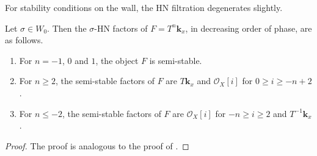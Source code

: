 \documentclass{amsart}
\begin{document}
For stability conditions on the wall, the HN filtration degenerates slightly.
\begin{proposition}\label{prop:HN0}
  Let \(\sigma \in W_{0}\).
  Then the \(\sigma\)-HN factors of \(F = T^n \mathbf{k}_x\), in decreasing order of phase, are as follows.
  \begin{enumerate}
  \item For \(n = -1\), \(0\) and \(1\), the object \(F\) is semi-stable.
  \item For \(n \geq 2\), the semi-stable factors of \(F\) are \(T\mathbf{k}_x\) and \(\mathcal{O}_X[i]\) for \(0 \geq i \geq -n+2\).
  \item For \(n \leq -2\), the semi-stable factors of \(F\) are \(\mathcal{O}_X[i]\) for \(-n \geq i \geq 2\) and \(T^{-1}\mathbf{k}_x\).
  \end{enumerate}
\end{proposition}
\begin{proof}
  The proof is analogous to the proof of .
\end{proof}
\end{document}
